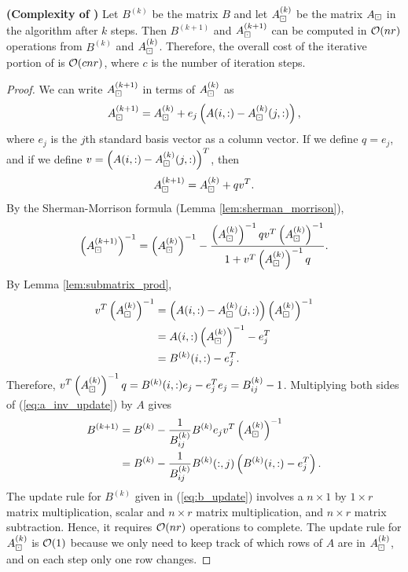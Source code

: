 \documentclass{article}
\begin{document}
	\begin{thm} \textnormal{\bf(Complexity of \maxvol{} \cite{goreinov_2010})}
		Let $B^{(k)}$ be the matrix $B$ and let $A_\boxdot^{(k)}$ be the matrix $A_\boxdot$ in the \maxvol{} algorithm after $k$ steps. Then $B^{(k+1)}$ and $A_\boxdot^{(k+1)}$ can be computed in $\mathcal{O}(nr)$ operations from $B^{(k)}$ and $A_\boxdot^{(k)}$. Therefore, the overall cost of the iterative portion of \maxvol{} is $\mathcal{O}(cnr)$, where $c$ is the number of iteration steps.
	\end{thm}
	
	\begin{proof}
		We can write $A_\boxdot^{(k+1)}$ in terms of $A_\boxdot^{(k)}$ as
		\begin{equation}
			A_\boxdot^{(k+1)} = A_\boxdot^{(k)} + e_j\left(A(i,:) - A_\boxdot^{(k)}(j,:)\right),
		\end{equation}
		where $e_j$ is the $j$th standard basis vector as a column vector. If we define $q = e_j$, and if we define $v = \left(A(i,:) - A_\boxdot^{(k)}(j,:)\right)^T$, then
		\begin{equation}
			A_\boxdot^{(k+1)} = A_\boxdot^{(k)} + qv^T.
		\end{equation}
		By the Sherman-Morrison formula (Lemma \ref{lem:sherman_morrison}),
		\begin{equation}
			\label{eq:a_inv_update}
			\left(A_\boxdot^{(k+1)}\right)^{-1} = \left(A_\boxdot^{(k)}\right)^{-1} - \frac{\left(A_\boxdot^{(k)}\right)^{-1}qv^T\left(A_\boxdot^{(k)}\right)^{-1}}{1 +v^T\left(A_\boxdot^{(k)}\right)^{-1}q}.
		\end{equation}
		By Lemma \ref{lem:submatrix_prod},
		\begin{align}
			v^T\left(A_\boxdot^{(k)}\right)^{-1} &= \left(A(i,:) - A_\boxdot^{(k)}(j,:)\right)\left(A_\boxdot^{(k)}\right)^{-1} \\
			&= A(i,:)\left(A_\boxdot^{(k)}\right)^{-1} - e_j^T \\
			&= B^{(k)}(i,:) - e_j^T.
		\end{align}
		Therefore, $v^T\left(A_\boxdot^{(k)}\right)^{-1}q = B^{(k)}(i,:)e_j - e_j^Te_j = B^{(k)}_{ij}-1$.
		Multiplying both sides of (\ref{eq:a_inv_update}) by $A$ gives
		\begin{align}
			B^{(k+1)} &= B^{(k)} - \frac{1}{B^{(k)}_{ij}}B^{(k)}e_jv^T\left(A_\boxdot^{(k)}\right)^{-1} \\
			\label{eq:b_update}
			&=B^{(k)} - \frac{1}{B^{(k)}_{ij}}B^{(k)}(:,j)\left(B^{(k)}(i,:) - e_j^T\right).
		\end{align}
		The update rule for $B^{(k)}$ given in (\ref{eq:b_update}) involves a $n\times 1$ by $1\times r$ matrix multiplication, scalar and $n\times r$ matrix multiplication, and $n\times r$ matrix subtraction. Hence, it requires $\mathcal{O}(nr)$ operations to complete. The update rule for $A_\boxdot^{(k)}$ is $\mathcal{O}(1)$ because we only need to keep track of which rows of $A$ are in $A_\boxdot^{(k)}$, and on each step only one row changes. 
		
	\end{proof}
	
\end{document}
